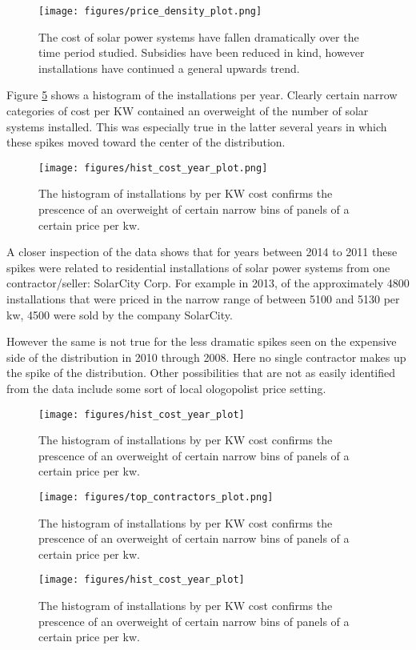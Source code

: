 \documentclass[12pt]{article}
\begin{document}
\begin{figure}
	\texttt{[image: figures/price\_density\_plot.png]}
	\caption{The cost of solar power systems have fallen dramatically over the time period studied.  Subsidies have been reduced in kind, however installations have continued a general upwards trend.}
	\label{price_density}	
	\end{figure}

Figure \ref{hist_cost_year} shows a histogram of the installations per year.  Clearly certain narrow categories of cost per KW contained an overweight of the number of solar systems installed.  This was especially true in the latter several years in which these spikes moved toward the center of the distribution.

\begin{figure}
	\texttt{[image: figures/hist\_cost\_year\_plot.png]}
	\caption{The histogram of installations by per KW cost confirms the prescence of an overweight of certain narrow bins of panels of a certain price per kw.}
	\label{hist_cost_year}	
	\end{figure}

A closer inspection of the data shows that for years between 2014 to 2011 these spikes were related to residential installations of solar power systems from one contractor/seller: SolarCity Corp.  For example in 2013, of the approximately 4800 installations that were priced in the narrow range of between 5100 and 5130 per kw, 4500 were sold by the company SolarCity.  

However the same is not true for the less dramatic spikes seen on the expensive side of the distribution in 2010 through 2008.  Here no single contractor makes up the spike of the distribution.  Other possibilities that are not as easily identified from the data include some sort of local ologopolist price setting.  

\begin{figure}
	\texttt{[image: figures/hist\_cost\_year\_plot]}
	\caption{The histogram of installations by per KW cost confirms the prescence of an overweight of certain narrow bins of panels of a certain price per kw.}
	\label{hist_cost_year}	
	\end{figure}

\begin{figure}
	\texttt{[image: figures/top\_contractors\_plot.png]}
	\caption{The histogram of installations by per KW cost confirms the prescence of an overweight of certain narrow bins of panels of a certain price per kw.}
	\label{hist_cost_year}	
	\end{figure}

\begin{figure}
	\texttt{[image: figures/hist\_cost\_year\_plot]}
	\caption{The histogram of installations by per KW cost confirms the prescence of an overweight of certain narrow bins of panels of a certain price per kw.}
	\label{hist_cost_year}	
	\end{figure}
\end{document}
